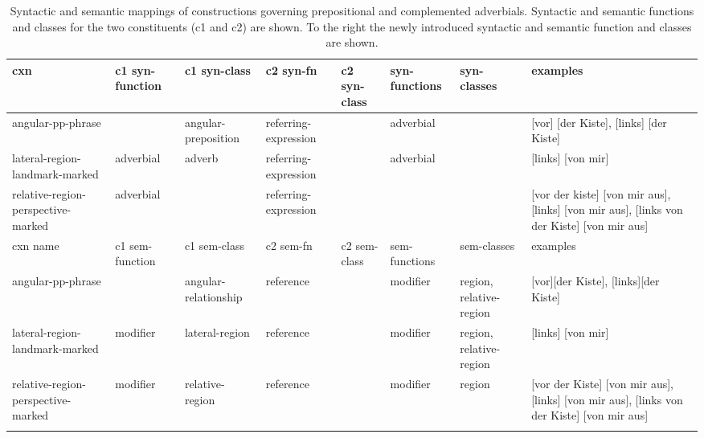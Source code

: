 \begin{table}
\begin{footnotesize}
\begin{tabular}{p{1.6cm}p{1.6cm}p{1.6cm}p{1.6cm}p{1.6cm}p{1.4cm}p{1.4cm}p{3.5cm}}
\lsptoprule
cxn &  c1 syn-function & c1 syn-class &  c2 syn-fn & c2 syn-class  & syn-functions & syn-classes & examples \\ \midrule
angular-pp-phrase & & angular-preposition & referring-expression & & adverbial & &[vor] [der Kiste], [links] [der Kiste]
\\ \hline  
lateral-region-landmark-marked  & adverbial &adverb & referring-expression & & adverbial & & [links] [von mir] 
\\ \hline  
relative-region-perspective-marked  &adverbial & &referring-expression & & & &
[vor der kiste] [von mir aus], [links] [von mir aus], [links von der Kiste] [von mir aus] 
\\ 
\hline
\hline
cxn name &  c1 sem-function & c1 sem-class &  c2 sem-fn & c2 sem-class  & sem-functions & sem-classes & examples \\ \hline\hline
angular-pp-phrase & & angular-relationship & reference & & modifier & region, relative-region & [vor][der Kiste], [links][der Kiste]
\\ \hline
lateral-region-landmark-marked  & modifier & lateral-region & reference & & modifier & region, relative-region & [links] [von mir] 
\\ \hline
relative-region-perspective-marked  & modifier & relative-region &reference & &modifier & region &
[vor der Kiste] [von mir aus],[links] [von mir aus], [links von der Kiste] [von mir aus] 
\\ \lspbottomrule
\end{tabular}
\end{footnotesize}
\label{t:landmark-perspective-cxns}
\caption[Syntactic and semantic mappings of constructions]{%
Syntactic and semantic mappings of constructions 
governing prepositional and complemented adverbials. Syntactic and semantic
functions and classes for the two constituents (c1 and c2) are shown. To the right
the newly introduced syntactic and semantic function and classes are shown.}
\end{table}

